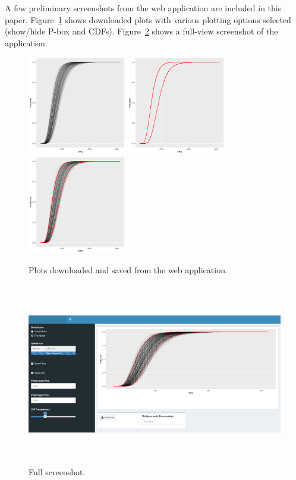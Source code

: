 \documentclass[11pt]{asaproc}\usepackage[]{graphicx}\usepackage[]{color}
\begin{document}
A few preliminary screenshots from the web application are included in this paper. Figure~\ref{dwnld_plt} shows downloaded plots with various plotting options selected (show/hide P-box and CDFs). Figure~\ref{full} shows a full-view screenshot of the application.  

\begin{figure}[t]
\begin{center} 
\includegraphics[height=4.3cm,width=4.3cm]{figures2/dwnld_plt_cdfs.png}
\includegraphics[height=4.3cm,width=4.3cm]{figures2/dwnld_plt_pbx.png}
\includegraphics[height=4.3cm,width=4.3cm]{figures2/dwnld_plt.png} 
\end{center} 
\caption{\label{dwnld_plt}Plots downloaded and saved from the web application.}
\end{figure}

\begin{figure}[t]
\begin{center} 
\includegraphics[height=8cm,width=15.5cm]{figures2/SS_full.png}
\end{center} 
\caption{\label{full}Full screenshot.}
\end{figure}
\end{document}
